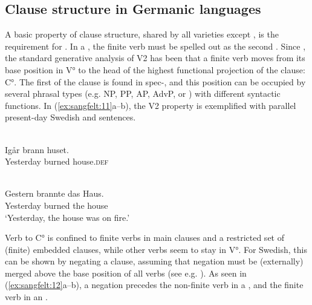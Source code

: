 \documentclass[output=paper, colorlinks, citecolor=brown]{langscibook}
\begin{document}
\subsection{Clause structure in Germanic languages}\label{sec:sangfelt:3.1}

A basic property of  clause structure, shared by all varieties except , is the requirement for . In a  , the finite verb must be spelled out as the second . Since \citet{denBesten1983}, the standard generative analysis of V2 has been that a finite verb moves from its base position in V° to the head of the highest functional projection of the clause: C°. The first  of the clause is found in spec-, and this position can be occupied by several phrasal types (e.g. NP, PP, AP, AdvP, or ) with different syntactic functions. In (\ref{ex:sangfelt:11}a–b), the V2 property is exemplified with parallel present-day Swedish and  sentences.

\ea
\label{ex:sangfelt:11}
\begin{multicols}{2}\raggedcolumns
\ea {}\\
\gll Igår brann huset. \\
 Yesterday burned house.\textsc{def}\\\label{ex:sangfelt:11a}\columnbreak
 
\ex {}\\
\gll Gestern brannte das Haus.\\
 Yesterday burned the house\\
\glt ‘Yesterday, the house was on fire.’\label{ex:sangfelt:11b}
\z 
\end{multicols}
\z 

Verb  to C° is confined to finite verbs in main clauses and a restricted set of (finite) embedded clauses, while other verbs seem to stay in V°. For Swedish, this can be shown by negating a clause, assuming that negation must be (externally) merged above the base position of all verbs (see e.g. \citealt{Zeijlstra2013}). As seen in (\ref{ex:sangfelt:12}a–b), a negation precedes the non-finite verb in a , and the finite verb in an .
\end{document}
